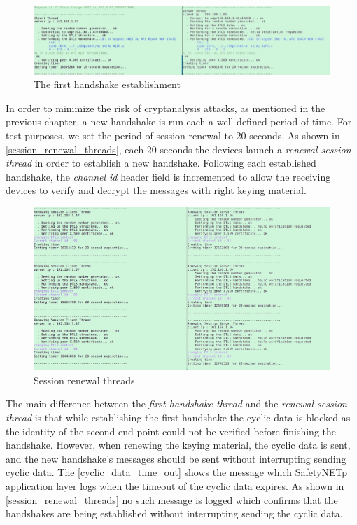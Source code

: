 \begin{figure}[H]
\centering
\includegraphics[width=19cm,frame]{figures/realization/first_handshake(1).jpg}
\caption{The first handshake establishment}\label{first_handshake}
\end{figure}

In order to minimize the risk of cryptanalysis attacks, as mentioned in the previous chapter,
a new handshake is run each a well defined period of time. For test purposes, we set the period of session renewal
to 20 seconds. As shown in \autoref{session_renewal_threads}, each 20 seconds the devices launch a \textit{renewal session thread}
in order to establish a new handshake. Following each established handshake, the \textit{channel id} header
field is incremented to allow the receiving devices to verify and decrypt the messages with right keying
material.

\begin{figure}[H]
\centering
\includegraphics[width=19cm,frame]{figures/realization/session_renewal(2).png}
\caption{Session renewal threads}\label{session_renewal_threads}
\end{figure}

The main difference between the \textit{first handshake thread} and the \textit{renewal session thread} is
that while establishing the first handshake the cyclic data is blocked as the identity of
the second end-point could not be verified before
finishing the handshake. However, when renewing the keying material, the cyclic data is sent,
and the new handshake's messages should be sent without interrupting sending cyclic data.
The \autoref{cyclic_data_time_out} shows the message which SafetyNETp application layer logs when
the timeout of the cyclic data expires. As shown in \autoref{session_renewal_threads} no such message
is logged which confirms that the handshakes are being established without interrupting sending the cyclic data.


